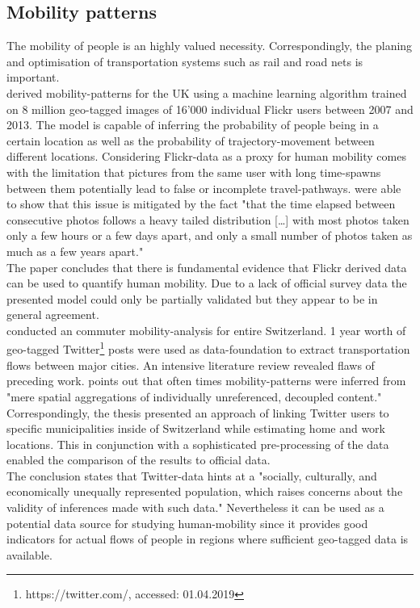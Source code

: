 \subsection{Mobility patterns}
The mobility of people is an highly valued necessity. Correspondingly, the planing and optimisation of transportation systems such as rail and road nets is important. \\

\textcite{Barchiesi2015} derived mobility-patterns for the UK using a machine learning algorithm trained on 8 million geo-tagged images of 16'000 individual Flickr users between 2007 and 2013. The model is capable of inferring the probability of people being in a certain location as well as the probability of trajectory-movement between different locations. Considering Flickr-data as a proxy for human mobility comes with the limitation that pictures from the same user with long time-spawns between them potentially lead to false or incomplete travel-pathways. \textcite[p.7]{Barchiesi2015} were able to show that this issue is mitigated by the fact "that the time elapsed between consecutive photos follows a heavy tailed distribution [\dots] with most photos taken only a few hours or a few days apart, and only a small number of photos taken as much as a few years apart." \\
The paper concludes that there is fundamental evidence that Flickr derived data can be used to quantify human mobility. Due to a lack of official survey data the presented model could only be partially validated but they appear to be in general agreement. \\

\textcite{Grossenbacher2014} conducted an commuter mobility-analysis for entire Switzerland. 1 year worth of geo-tagged Twitter\footnote{https://twitter.com/, accessed: 01.04.2019} posts were used as data-foundation to extract transportation flows between major cities. An intensive literature review revealed flaws of preceding work. \citeauthor[p.5]{Grossenbacher2014} points out that often times mobility-patterns were inferred from "mere spatial aggregations of individually unreferenced, decoupled content." Correspondingly, the thesis presented an approach of linking Twitter users to specific municipalities inside of Switzerland while estimating home and work locations. This in conjunction with a sophisticated pre-processing of the data enabled the comparison of the results to official data.\\
The conclusion states that Twitter-data hints at a "socially, culturally, and economically unequally represented population, which raises concerns about the validity of inferences made with such data." \parencite[p.4]{Grossenbacher2014} Nevertheless it can be used as a potential data source for studying human-mobility since it provides good indicators for actual flows of people in regions where sufficient geo-tagged data is available.

